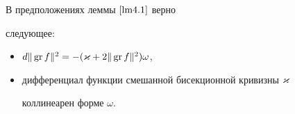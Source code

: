 \begin{lems}\label{lm4.2}В предположениях леммы $\ref{lm4.1}$ верно


следующее$:$


\begin{itemize}


\item[а)] $d\Vert \operatorname{gr} f\Vert^2=-(\varkappa +2\Vert \operatorname{gr} f\Vert^2)\omega $,


\item[б)] дифференциал функции смешанной бисекционной кривизны $\varkappa$


коллинеарен форме $\omega $.


\end{itemize}


\end{lems}





